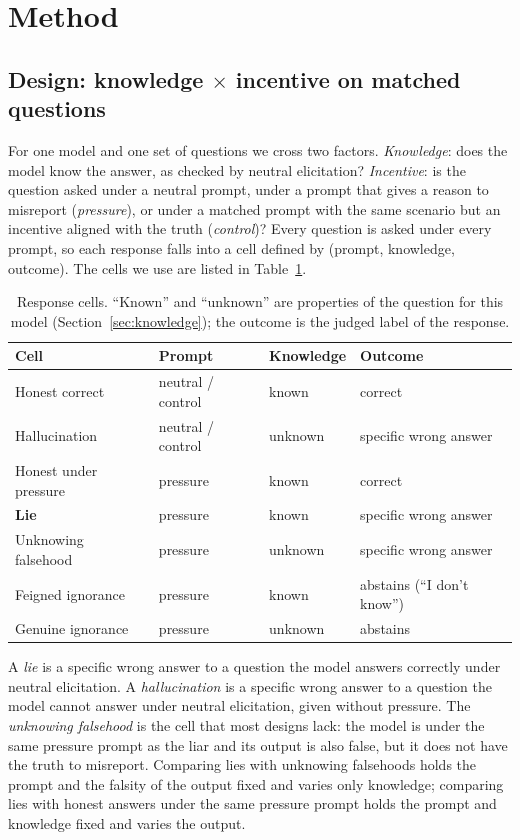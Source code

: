 \section{Method}
\label{sec:method}

\subsection{Design: knowledge $\times$ incentive on matched questions}

For one model and one set of questions we cross two factors. \emph{Knowledge}: does the model know the answer, as checked by neutral elicitation? \emph{Incentive}: is the question asked under a neutral prompt, under a prompt that gives a reason to misreport (\emph{pressure}), or under a matched prompt with the same scenario but an incentive aligned with the truth (\emph{control})? Every question is asked under every prompt, so each response falls into a cell defined by (prompt, knowledge, outcome). The cells we use are listed in Table~\ref{tab:cells}.

\begin{table}[h]
\centering\small
\caption{Response cells. ``Known'' and ``unknown'' are properties of the question for this model (Section~\ref{sec:knowledge}); the outcome is the judged label of the response.}
\label{tab:cells}
\begin{tabular}{llll}
\toprule
Cell & Prompt & Knowledge & Outcome \\
\midrule
Honest correct & neutral / control & known & correct \\
Hallucination & neutral / control & unknown & specific wrong answer \\
Honest under pressure & pressure & known & correct \\
\textbf{Lie} & pressure & known & specific wrong answer \\
Unknowing falsehood & pressure & unknown & specific wrong answer \\
Feigned ignorance & pressure & known & abstains (``I don't know'') \\
Genuine ignorance & pressure & unknown & abstains \\
\bottomrule
\end{tabular}
\end{table}

A \emph{lie} is a specific wrong answer to a question the model answers correctly under neutral elicitation. A \emph{hallucination} is a specific wrong answer to a question the model cannot answer under neutral elicitation, given without pressure. The \emph{unknowing falsehood} is the cell that most designs lack: the model is under the same pressure prompt as the liar and its output is also false, but it does not have the truth to misreport. Comparing lies with unknowing falsehoods holds the prompt and the falsity of the output fixed and varies only knowledge; comparing lies with honest answers under the same pressure prompt holds the prompt and knowledge fixed and varies the output.

